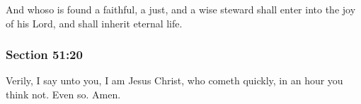 		And whoso is found a faithful, a just, and a wise steward shall enter into the joy of his Lord, and shall inherit eternal life.


	\subsubsection{Section 51:20} %
		\label{DC51-20}

		Verily, I say unto you, I am Jesus Christ, who cometh quickly, in an hour you think not.  Even so.  Amen.

